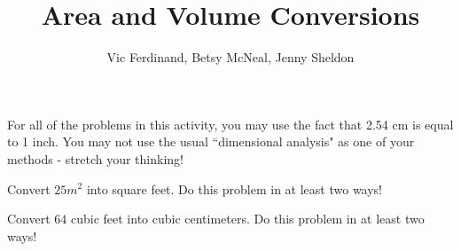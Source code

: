 \documentclass[nooutcomes]{ximera}
\title{Area and Volume Conversions}
\author{Vic Ferdinand, Betsy McNeal, Jenny Sheldon}
\begin{document}
\begin{abstract}\end{abstract}
\maketitle


For all of the problems in this activity, you may use the fact that 2.54 cm is equal to 1 inch.  You may not use the usual ``dimensional analysis" as one of your methods - stretch your thinking!



\begin{problem}
Convert $25m^2$ into square feet.  Do this problem in at least two ways!

\end{problem}

\begin{problem}
Convert $64$ cubic feet into cubic centimeters.  Do this problem in at least two ways!

\end{problem}
\end{document}
